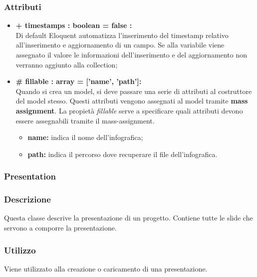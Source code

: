 \subsubsection*{Attributi}
	\begin{itemize}
		\item \textbf{+ timestamps : boolean = false :}\\
		Di default Eloquent automatizza l'inserimento del timestamp relativo all'inserimento e aggiornamento di un campo. Se alla variabile viene assegnato il valore le informazioni dell'inserimento e del aggiornamento non verranno aggiunto alla collection;
		\item \textbf{\# fillable : array = [’name’, ’path’]:}\\
		Quando si crea un model, si deve passare una serie di attributi al costruttore del model stesso. Questi attributi vengono assegnati al model tramite \textbf{mass assignment}. La propietà \textit{fillable} serve a specificare quali attributi devono essere assegnabili tramite il mass-assignment.
		\begin{itemize}
			\item \textbf{name:} indica il nome dell'infografica;
			\item \textbf{path:} indica il percorso dove recuperare il file dell'infografica.
		\end{itemize}
	\end{itemize}


\newpage
\subsubsection{Presentation}


	\subsubsection*{Descrizione}
	Questa classe descrive la presentazione di un progetto. Contiene tutte le slide che servono a comporre la presentazione.

	\subsubsection*{Utilizzo}
	Viene utilizzato alla creazione o caricamento di una presentazione.
	
